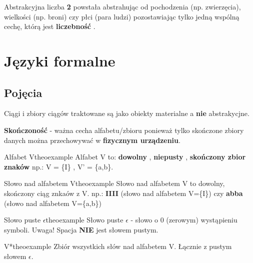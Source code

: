 		Abstrakcyjna liczba { \bf 2} powstała abstrahując od pochodzenia (np. zwierzęcia), 
		wielkości (np. broni) czy płci (para ludzi) pozostawiając tylko jedną wspólną cechę,
		którą jest { \bf liczebność} . 
		 

\newpage
\section{Języki formalne}
	\subsection{Pojęcia}
		
		Ciągi i zbiory ciągów traktowane są jako obiekty materialne a 
		{ \bf nie } abstrakycjne. \newline
		
		{ \bf Skończoność} - ważna cecha alfabetu/zbioru ponieważ tylko skończone 
		zbiory danych można przechowywać w { \bf fizycznym urządzeniu}. \newline \newline
		

		\begin{mytheo}{Alfabet V}{theoexample}
			Alfabet V to: { \bf dowolny} , { \bf niepusty} , 
			{ \bf skończony zbior znaków} \newline np.: V = \{I\} , V' = \{a,b\}. \newline
		\end{mytheo}


		\begin{mytheo}{Słowo nad alfabetem V}{theoexample}
			Słowo nad alfabetem V to dowolny, skończony ciąg znkaów z 
			V. np.: {\bf IIII} (słowo nad alfabetem V=\{I\}) czy {\bf abba} 
			(słowo nad alfabetem V=\{a,b\}) 
		\end{mytheo}


		\begin{mytheo}{Słowo puste $\epsilon$}{theoexample}
			Słowo puste $\epsilon$ - słowo o 0 (zerowym) wystąpieniu symboli. \newline
			Uwaga! Spacja {\bf NIE} jest słowem pustym.
		\end{mytheo}

		 
		 \begin{mytheo}{V*}{theoexample}
			Zbiór wszystkich słów nad alfabetem V. Łącznie z pustym słowem $\epsilon$.
		\end{mytheo}


